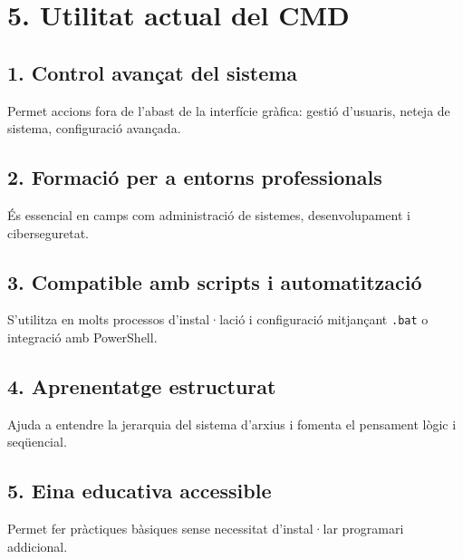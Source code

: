 \documentclass[
  a4paper,
]{article}
\begin{document}
\section{5. Utilitat actual del CMD}\label{utilitat-actual-del-cmd}

\subsection{1. Control avançat del
sistema}\label{control-avanuxe7at-del-sistema}

Permet accions fora de l'abast de la interfície gràfica: gestió
d'usuaris, neteja de sistema, configuració avançada.

\subsection{2. Formació per a entorns
professionals}\label{formaciuxf3-per-a-entorns-professionals}

És essencial en camps com administració de sistemes, desenvolupament i
ciberseguretat.

\subsection{3. Compatible amb scripts i
automatització}\label{compatible-amb-scripts-i-automatitzaciuxf3}

S'utilitza en molts processos d'instal·lació i configuració mitjançant
\texttt{.bat} o integració amb PowerShell.

\subsection{4. Aprenentatge estructurat}\label{aprenentatge-estructurat}

Ajuda a entendre la jerarquia del sistema d'arxius i fomenta el
pensament lògic i seqüencial.

\subsection{5. Eina educativa
accessible}\label{eina-educativa-accessible}

Permet fer pràctiques bàsiques sense necessitat d'instal·lar programari
addicional.
\end{document}
